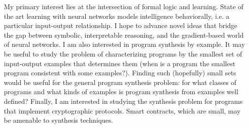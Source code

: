 \documentclass{article}
\begin{document}
My primary interest lies at the intersection of formal logic and
learning. State of the art learning with neural networks models
intelligence behaviorally, i.e. a particular input-output
relationship. I hope to advance novel ideas that bridge the gap
between symbolic, interpretable reasoning, and the gradient-based
world of neural networks.  I am also interested in program synthesis
by example. It may be useful to study the problem of characterizing
programs by the smallest set of input-output examples that determines
them (when is a program the smallest program consistent with some
examples?). Finding such (hopefully) small sets would be useful for
the general program synthesis problem: for what classes of programs
and what kinds of examples is program synthesis from examples well
defined? Finally, I am interested in studying the synthesis problem
for programs that implement cryptographic protocols. Smart contracts,
which are small, may be amenable to synthesis techniques.

\end{document}
